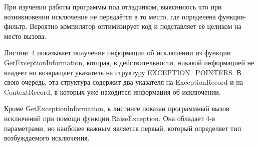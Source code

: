 \documentclass[a4paper,12pt]{article} %
\begin{document}
При изучении работы программы под отладчиком, выяснилось что при возникновении исключение не передаётся в то место, где определена функция-фильтр. Вероятно компилятор оптимизирует код и подставляет её целиком на место вызова.
\newpage

Листинг 4 показывает получение информации об исключении из функции \\ GetExceptionInformation, которая, в действительности, никакой информацией не владеет но возвращает указатель на структуру EXCEPTION\_POINTERS. В свою очередь, эта структура содержит два указателя на ExceptionRecord и на ContextRecord, в которых уже находится информация об исключении.

Кроме GetExceptionlnformation, в листинге показан программный вызов исключений при помощи функции RaiseException. Она обладает 4-я параметрами, но наиболее важным является первый, который определяет тип возбуждаемого исключения.
\end{document}
